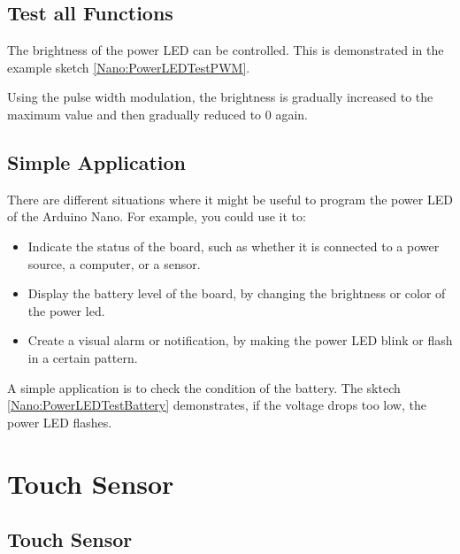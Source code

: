 \subsection{Test all Functions}

The brightness of the power LED can be controlled. This is demonstrated in the example sketch \ref{Nano:PowerLEDTestPWM}.

Using the pulse width modulation, the brightness is gradually increased to the maximum value and then gradually reduced to 0 again.




{
	\label{Nano:PowerLEDTestPWM}
}

\subsection{Simple Application}


There are different situations where it might be useful to program the power LED of the Arduino Nano. For example, you could use it to:

\begin{itemize}
	\item Indicate the status of the board, such as whether it is connected to a power source, a computer, or a sensor.
	\item  Display the battery level of the board, by changing the brightness or color of the power \ac{led}.
	\item Create a visual alarm or notification, by making the power LED blink or flash in a certain pattern.
\end{itemize}

\bigskip

A simple application is to check the condition of the battery. The sktech \ref{Nano:PowerLEDTestBattery} demonstrates, if the voltage drops too low, the power LED flashes.

{
	\label{Nano:PowerLEDTestBattery}
}

\section{Touch Sensor}
\subsection{Touch Sensor}

